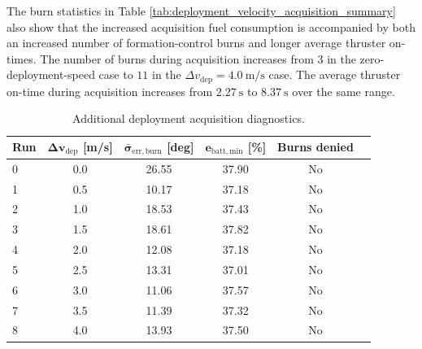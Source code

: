 The burn statistics in Table \ref{tab:deployment_velocity_acquisition_summary} also show that the increased acquisition fuel consumption is accompanied by both an increased number of formation-control burns and longer average thruster on-times. The number of burns during acquisition increases from $3$ in the zero-deployment-speed case to $11$ in the $\Delta v_{\mathrm{dep}} = 4.0~\mathrm{m/s}$ case. The average thruster on-time during acquisition increases from $2.27~\mathrm{s}$ to $8.37~\mathrm{s}$ over the same range.


\begin{table}[H]
    \centering
    \caption{Additional deployment acquisition diagnostics.}
    \label{tab:deployment_velocity_acquisition_diagnostics}
    \begin{tabular}{lccccc}
        \toprule
        \textbf{Run} &
        $\boldsymbol{\Delta v_{\mathrm{dep}}}$ \textbf{[m/s]} &
        $\boldsymbol{\bar{\sigma}_{\mathrm{err,burn}}}$ \textbf{[deg]} &
        $\boldsymbol{e_{\mathrm{batt,min}} }$ \textbf{[\%]} &
        \textbf{Burns denied} \\
        \midrule
        0 & 0.0 & 26.55 & 37.90 & No \\
        1 & 0.5 & 10.17 & 37.18 & No  \\
        2 & 1.0 & 18.53 & 37.43 & No \\
        3 & 1.5 & 18.61 & 37.82 & No \\
        4 & 2.0 & 12.08 & 37.18 & No \\
        5 & 2.5 & 13.31 & 37.01 & No  \\
        6 & 3.0 & 11.06 & 37.57 & No \\
        7 & 3.5 & 11.39 & 37.32 & No \\
        8 & 4.0 & 13.93 & 37.50 & No \\
        \bottomrule
    \end{tabular}
\end{table}









